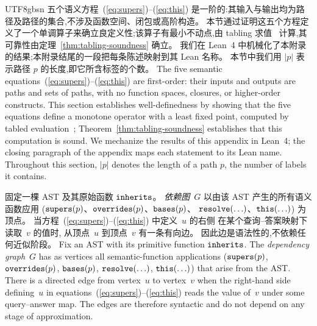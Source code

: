 \begin{CJK*}{UTF8}{gbsn}
\ifPaperChinese
五个语义方程~(\ref{eq:supers})--(\ref{eq:this}) 是一阶的:其输入与输出均为路径及路径的集合,不涉及函数空间、闭包或高阶构造。
本节通过证明这五个方程定义了一个单调算子来确立良定义性;该算子有最小不动点,由 tabling 求值~\cite{tamaki1986-tabled-resolution} 计算,其可靠性由定理~\ref{thm:tabling-soundness} 确立。
我们在 Lean~4 中机械化了本附录的结果;本附录结尾的一段把每条陈述映射到其 Lean 名称。
本节中我们用 $|p|$ 表示路径 $p$ 的长度,即它所含标签的个数。
\else
The five semantic
equations~(\ref{eq:supers})--(\ref{eq:this}) are
first-order: their inputs and outputs are paths and sets of
paths, with no function spaces, closures, or higher-order
constructs.
This section establishes well-definedness by showing that
the five equations define a monotone operator with a least
fixed point, computed by tabled
evaluation~\cite{tamaki1986-tabled-resolution}; Theorem~\ref{thm:tabling-soundness}
establishes that this computation is sound.
We mechanize the results of this appendix in Lean~4; the closing paragraph
of the appendix maps each statement to its Lean name.
Throughout this section, $|p|$ denotes the length of a path $p$, the number
of labels it contains.
\fi

\begin{definition}\label{def:dependency-graph}
\ifPaperChinese
  固定一棵 AST 及其原始函数 $\mathtt{inherits}$。
  \emph{依赖图}~$G$ 以由该 AST 产生的所有语义函数应用
  ($\mathtt{supers}(p)$、\allowbreak$\mathtt{overrides}(p)$、\allowbreak$\mathtt{bases}(p)$、\allowbreak
  $\mathtt{resolve}(\ldots)$、\allowbreak$\mathtt{this}(\ldots)$) 为顶点。
  当方程~(\ref{eq:supers})--(\ref{eq:this}) 中定义~$u$ 的右侧
  在某个查询--答案映射下读取~$v$ 的值时,
  从顶点~$u$ 到顶点~$v$ 有一条有向边。
  因此边是语法性的,不依赖任何近似阶段。
\else
  Fix an AST with its primitive function
  $\mathtt{inherits}$.
  The \emph{dependency graph}~$G$ has as vertices all
  semantic-function applications
  ($\mathtt{supers}(p)$, $\mathtt{overrides}(p)$,
    $\mathtt{bases}(p)$, $\mathtt{resolve}(\ldots)$,
  $\mathtt{this}(\ldots)$) that arise from the AST\@.
  There is a directed edge from vertex~$u$ to vertex~$v$ when the
  right-hand side defining~$u$ in
  equations~(\ref{eq:supers})--(\ref{eq:this}) reads the value
  of~$v$ under some query--answer map.
  The edges are therefore syntactic and do not depend on any stage
  of approximation.
\fi
\end{definition}


\end{CJK*}
